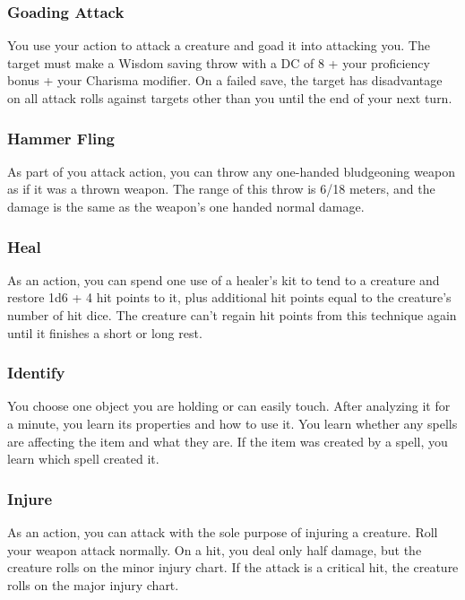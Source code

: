 \subsubsection{Goading Attack} \label{tec::goadingattack}
You use your action to attack a creature and goad it into attacking you.
The target must make a Wisdom saving throw with a DC of 8 + your proficiency bonus + your Charisma modifier.
On a failed save, the target has disadvantage on all attack rolls against targets other than you until the end of your next turn.

\subsubsection{Hammer Fling} \label{tec::hammerfling}
As part of you attack action, you can throw any one-handed bludgeoning weapon as if it was a thrown weapon.
The range of this throw is 6/18 meters, and the damage is the same as the weapon's one handed normal damage.

\subsubsection{Heal} \label{tec::heal}
As an action, you can spend one use of a healer's kit to tend to a creature and restore 1d6 + 4 hit points to it, plus additional hit points equal to the creature's number of hit dice.
The creature can't regain hit points from this technique again until it finishes a short or long rest.

\subsubsection{Identify} \label{tec::identify}
You choose one object you are holding or can easily touch.
After analyzing it for a minute, you learn its properties and how to use it.
You learn whether any spells are affecting the item and what they are.
If the item was created by a spell, you learn which spell created it.

\subsubsection{Injure} \label{tec::injure}
As an action, you can attack with the sole purpose of injuring a creature.
Roll your weapon attack normally.
On a hit, you deal only half damage, but the creature rolls on the minor injury chart.
If the attack is a critical hit, the creature rolls on the major injury chart.

